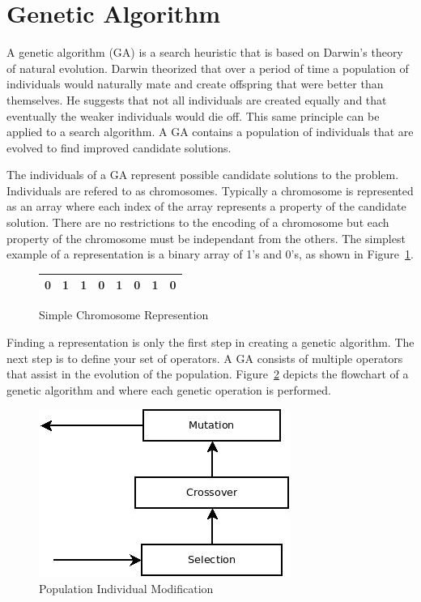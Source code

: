 \section{Genetic Algorithm}

A genetic algorithm (GA) is a search heuristic that is based on Darwin's theory of natural evolution. Darwin theorized that over a period of time a population of individuals would naturally mate and create offspring that were better than themselves. He suggests that not all individuals are created equally and that eventually the weaker individuals would die off. This same principle can be applied to a search algorithm. A GA contains a population of individuals that are evolved to find improved candidate solutions.

The individuals of a GA represent possible candidate solutions to the problem. Individuals are refered to as chromosomes. Typically a chromosome is represented as an array where each index of the array represents a property of the candidate solution. There are no restrictions to the encoding of a chromosome but each property of the chromosome must be independant from the others. The simplest example of a representation is a binary array of 1's and 0's, as shown in Figure~\ref{fig:sampleChromosome}.

\begin{figure}[H]
  \label{fig:sampleChromosome}
  \centering
  \begin{tabular}{ | l | l | l | l | l | l | l | l | }
    \hline
    0 & 1 & 1 & 0 & 1 & 0 & 1 & 0 \\
    \hline
  \end{tabular}
  \caption{Simple Chromosome Represention}
\end{figure}

Finding a representation is only the first step in creating a genetic algorithm. The next step is to define your set of operators. A GA consists of multiple operators that assist in the evolution of the population. Figure~\ref{fig:gaFlowchart} depicts the flowchart of a genetic algorithm and where each genetic operation is performed.

\begin{figure}[H]
	\centering
	\includegraphics[bb=0 0 310 207,scale=0.5]{figures/GA.jpeg}
	\caption{Population Individual Modification}
	\label{fig:gaFlowchart}
\end{figure}

